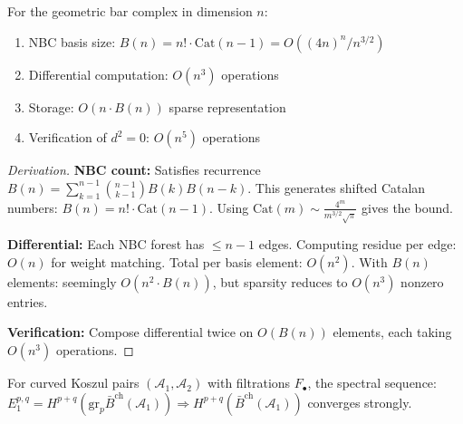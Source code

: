 \begin{theorem}
For the geometric bar complex in dimension $n$:
\begin{enumerate}
\item NBC basis size: $B(n) = n! \cdot \text{Cat}(n-1) = O((4n)^n/n^{3/2})$
\item Differential computation: $O(n^3)$ operations
\item Storage: $O(n \cdot B(n))$ sparse representation
\item Verification of $d^2=0$: $O(n^5)$ operations
\end{enumerate}
\end{theorem}

\begin{proof}[Derivation]
\textbf{NBC count:} Satisfies recurrence $B(n) = \sum_{k=1}^{n-1} \binom{n-1}{k-1} B(k)B(n-k)$.
This generates shifted Catalan numbers: $B(n) = n! \cdot \text{Cat}(n-1)$.
Using $\text{Cat}(m) \sim \frac{4^m}{m^{3/2}\sqrt{\pi}}$ gives the bound.

\textbf{Differential:} Each NBC forest has $\leq n-1$ edges. 
Computing residue per edge: $O(n)$ for weight matching.
Total per basis element: $O(n^2)$.
With $B(n)$ elements: seemingly $O(n^2 \cdot B(n))$, but sparsity reduces to $O(n^3)$ nonzero entries.

\textbf{Verification:} Compose differential twice on $O(B(n))$ elements, each taking $O(n^3)$ operations.
\end{proof}

\begin{theorem}\label{thm:spectral-convergence}
For curved Koszul pairs $(\mathcal{A}_1, \mathcal{A}_2)$ with filtrations $F_\bullet$, the spectral sequence:
$E_1^{p,q} = H^{p+q}(\text{gr}_p \bar{B}^{\text{ch}}(\mathcal{A}_1)) \Rightarrow H^{p+q}(\bar{B}^{\text{ch}}(\mathcal{A}_1))$
converges strongly.
\end{theorem}

